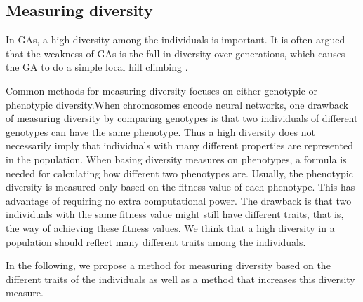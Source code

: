 \subsection{Measuring diversity}
In GAs, a high diversity among the individuals is important. It is often argued that the weakness of GAs is the fall in diversity over generations, which causes the GA to do a simple local hill climbing \citpls{}.

Common methods for measuring diversity focuses on either genotypic or phenotypic diversity.When chromosomes encode neural networks, one drawback of measuring diversity by comparing genotypes is that two individuals of different genotypes can have the same phenotype. Thus a high diversity does not necessarily imply that individuals with many different properties are represented in the population.
%
%
When basing diversity measures on phenotypes, a formula is needed for calculating how different two phenotypes are.  Usually, the phenotypic diversity is measured only based on the fitness value of each phenotype.
This has advantage of requiring no extra computational power. The drawback is that two individuals with the same fitness value might still have different traits, that is, the way of achieving these fitness values. We think that a high diversity in a population should reflect many different traits among the individuals.

In the following, we propose a method for measuring diversity based on the different traits of the individuals as well as a method that increases this diversity measure. 

